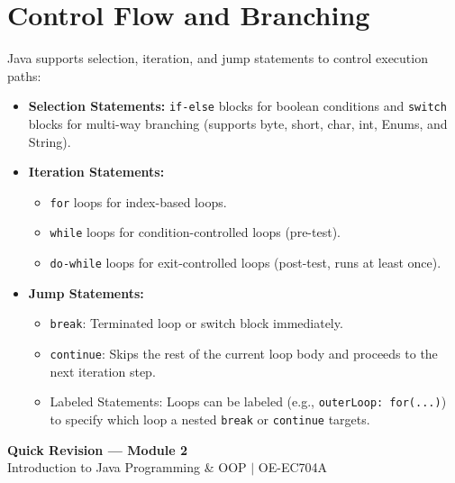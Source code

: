 \documentclass[12pt,a4paper]{article}
\begin{document}
\section{Control Flow and Branching}

Java supports selection, iteration, and jump statements to control execution paths:
\begin{itemize}[leftmargin=*, itemsep=4pt]
  \item \textbf{Selection Statements:} \texttt{if-else} blocks for boolean conditions and \texttt{switch} blocks for multi-way branching (supports byte, short, char, int, Enums, and String).
  \item \textbf{Iteration Statements:} 
        \begin{itemize}[leftmargin=*, label=--]
          \item \texttt{for} loops for index-based loops.
          \item \texttt{while} loops for condition-controlled loops (pre-test).
          \item \texttt{do-while} loops for exit-controlled loops (post-test, runs at least once).
        \end{itemize}
  \item \textbf{Jump Statements:}
        \begin{itemize}[leftmargin=*, label=--]
          \item \texttt{break}: Terminated loop or switch block immediately.
          \item \texttt{continue}: Skips the rest of the current loop body and proceeds to the next iteration step.
          \item Labeled Statements: Loops can be labeled (e.g., \texttt{outerLoop: for(...)}) to specify which loop a nested \texttt{break} or \texttt{continue} targets.
        \end{itemize}
\end{itemize}

\newpage
\begin{center}
  {\large\bfseries\color{myred} Quick Revision --- Module 2}\\[3pt]
  {\small\color{mydark} Introduction to Java Programming \& OOP $|$ OE-EC704A}
\end{center}
\noindent{\color{myred}\rule{\linewidth}{1.2pt}}
\vspace{4pt}
\end{document}
